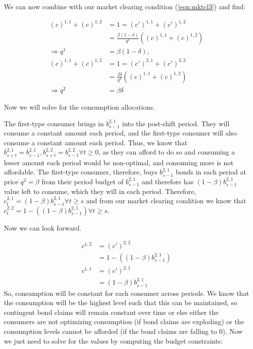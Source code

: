 \documentclass[11pt]{article} %
\begin{document}
We can now combine with our market clearing condition  (\ref{eqn:mktcl3}) and find:

\begin{align*}
(c)^{1,1} + (c)^{1,2} &= 1 = (c')^{1,1} + (c')^{1,2}\\
&= \frac{\beta(1-\delta)}{q^1}((c)^{1,1} + (c)^{1,2})\\
\Rightarrow q^1 &= \beta(1-\delta),\\
(c)^{1,1} + (c)^{1,2} &= 1 = (c')^{2,1} + (c')^{2,2}\\
&=  \frac{\beta\delta}{q^2}((c)^{1,1} + (c)^{1,2})\\
\Rightarrow q^2 &= \beta \delta
\end{align*}

Now we will solve for the consumption allocations.

The first-type consumer brings in $b_{s-1}^{2,1}$ into the post-shift period. They will consume a constant amount each period, and the first-type consumer will also consume a constant amount each period. Thus, we know that $b^{2,1}_{s+t} = b_{s-1}^{2,1}, b^{2,2}_{s+t} = b_{s-1}^{2,2} \forall t\geq0$, as they can afford to do so and consuming a lesser amount each period would be non-optimal, and consuming more is not affordable. The first-type consumer, therefore, buys $b_{s-1}^{2,1}$ bonds in each period at price $q^2 = \beta$ from their period budget of $b_{s-1}^{2,1}$ and therefore has $(1-\beta)b_{s-1}^{2,1}$ value left to consume, which they will in each period. Therefore, $c_t^{2,1} = (1-\beta)b_{s-1}^{2,1} \forall t\geq s$ and from our market clearing condition we know that $c_t^{2,2} = 1-((1-\beta)b_{s-1}^{2,1}) \forall t\geq s.$  

Now we can look forward.

\begin{align*}
c^{1,2} &= (c')^{2,2}\\
&=  1-((1-\beta)b_{s-1}^{2,1})\\
c^{1,1} &= (c')^{2,1}\\
&= (1-\beta)b_{s-1}^{2,1}
\end{align*}
So, consumption will be constant for each consumer across periods. We know that the consumption will be the highest level such that this can be maintained, so contingent bond claims will remain constant over time or else either the consumers are not optimizing consumption (if bond claims are exploding) or the consumption levels cannot be afforded (if the bond claims are falling to 0). Now we just need to solve for the values by computing the budget constraints:
\end{document}
